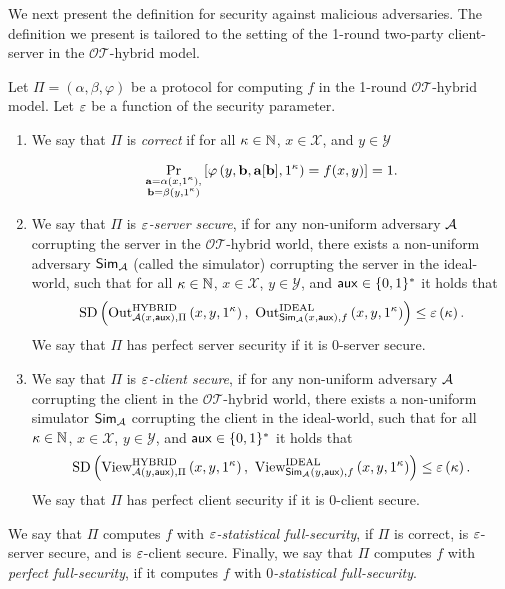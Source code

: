\documentclass{llncs}
\newcommand{\OTfunc}{\mathcal{OT}}
\newcommand{\OThybrid}{\OTfunc\mbox{-}\text{hybrid}}
\newcommand{\X}{\mathcal{X}}
\newcommand{\Y}{\mathcal{Y}}
\renewcommand{\b}{\myvec{b}}
\renewcommand{\a}{\myvec{a}}
\newcommand{\aux}{\mathsf{aux}}
\newcommand{\HYBRID}{\operatorname{HYBRID}}
\newcommand{\IDEAL}{\operatorname{IDEAL}}
\newcommand{\Out}{\operatorname{Out}}
\newcommand{\View}{\operatorname{View}}
\newcommand{\srvr}{\alpha}
\newcommand{\clnt}{\beta}
\newcommand{\local}{\varphi}
\renewcommand{\SD}{\operatorname*{SD}}
\begin{document}
We next present the definition for security against malicious adversaries. The definition we present is tailored to the setting of the 1-round two-party client-server in the $\OThybrid$ model.
\begin{definition}\label{def:perfectsec}
	Let $\Pi=(\srvr,\clnt,\local)$ be a protocol for computing $f$ in the 1-round $\OThybrid$ model. Let $\varepsilon$ be a function of the security parameter.
    \begin{enumerate}
    \item\label{item:corr} We say that $\Pi$ is \emph{correct} if for all $\kappa\in{\mathbb{N}}$, $x\in\X$, and $y\in\Y$
  
  $$\Pr_{\substack{\a=\srvr\of{x,1^{\kappa}},\\\b=\clnt\of{y,1^{\kappa}}}}\left[\local\of{y,\b,\a[\b],1^{\kappa}}=f(x,y)\right]=1.$$
    
    \item\label{item:malser} We say that $\Pi$ is \emph{$\varepsilon$-server secure}, if for any non-uniform adversary $\mathcal{A}$ corrupting the server in the $\OThybrid$ world, there exists a non-uniform adversary $\mathsf{Sim}_{\mathcal{A}}$ (called the simulator) corrupting the server in the ideal-world, such that for all $\kappa\in{\mathbb{N}}$, $x\in\X$, $y\in\Y$, and $\aux\in\zo^*$ it holds that
    $$\SD\of{\Out^{\HYBRID}_{\adv\of{x,\aux},\Pi}\of{x,y,1^{\kappa}},~\Out^{\IDEAL}_{\Sim_{\adv}\of{x,\aux},f}\of{x,y,1^{\kappa}}}\leq\eps\of{\kappa}.$$
    We say that $\Pi$ has perfect server security if it is 0-server secure.
    
    \item\label{item:malcl} We say that $\Pi$ is \emph{$\varepsilon$-client secure}, if for any non-uniform adversary $\mathcal{A}$ corrupting the client in the $\OThybrid$ world, there exists a non-uniform simulator $\mathsf{Sim}_{\mathcal{A}}$ corrupting the client in the ideal-world, such that for all $\kappa\in{\mathbb{N}}$, $x\in\X$, $y\in\Y$, and $\aux\in\zo^*$ it holds that
    $$\SD\of{\View^{\HYBRID}_{\adv\of{y,\aux},\Pi}\of{x,y,1^{\kappa}},~\View^{\IDEAL}_{\Sim_{\adv}\of{y,\aux},f}\of{x,y,1^{\kappa}}}\leq\eps\of{\kappa}.$$
     We say that $\Pi$ has perfect client security if it is 0-client secure.
    \end{enumerate}
    
     We say that $\Pi$ computes $f$ with \emph{$\varepsilon$-statistical full-security}, if $\Pi$ is correct, is $\varepsilon$-server secure, and is $\varepsilon$-client secure. Finally, we say that $\Pi$ computes $f$ with \emph{perfect full-security}, if it computes $f$ with \emph{$0$-statistical full-security}.
\end{definition}
\end{document}
